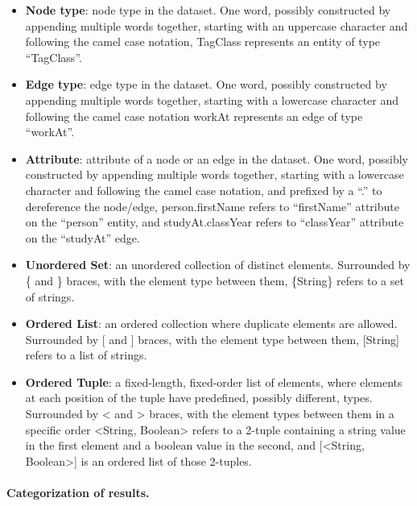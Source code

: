 \begin{itemize}
	\item \textbf{Node type}: node type in the dataset.
		One word, possibly constructed by appending multiple words together, starting with an uppercase character and following the camel case notation,
        \eg \textsf{TagClass} represents an entity of type ``TagClass''.
    \item \textbf{Edge type}: edge type in the dataset.
        One word, possibly constructed by appending multiple words together, starting with a lowercase character and following the camel case notation
        \eg \mbox{\textsf{workAt}} represents an edge of type ``workAt''.
    \item \textbf{Attribute}: attribute of a node or an edge in the dataset.
        One word, possibly constructed by appending multiple words together, starting with a lowercase character and following the camel case notation,
        and prefixed by a ``.'' to dereference the node/edge,
        \eg \textsf{person.firstName} refers to ``firstName'' attribute on the ``person'' entity,
        and \mbox{\textsf{studyAt.classYear}} refers to ``classYear'' attribute on the ``studyAt'' edge.
    \item \textbf{Unordered Set}: an unordered collection of distinct elements.
        Surrounded by \{ and \} braces, with the element type between them,
        \eg \textsf{\{String\}} refers to a set of strings.
    \item \textbf{Ordered List}: an ordered collection where duplicate elements are allowed.
        Surrounded by [ and ] braces, with the element type between them,
        \eg \textsf{[String]} refers to a list of strings.
    \item \textbf{Ordered Tuple}: a fixed-length, fixed-order list of elements, where elements at each position of the tuple have predefined, possibly different, types.
        Surrounded by < and > braces, with the element types between them in a specific order
        \eg \textsf{<String, Boolean>} refers to a 2-tuple containing a string value in the first element and a boolean value in the second,
        and \textsf{[<String, Boolean>]} is an ordered list of those 2-tuples.
\end{itemize}

\paragraph{Categorization of results.}

